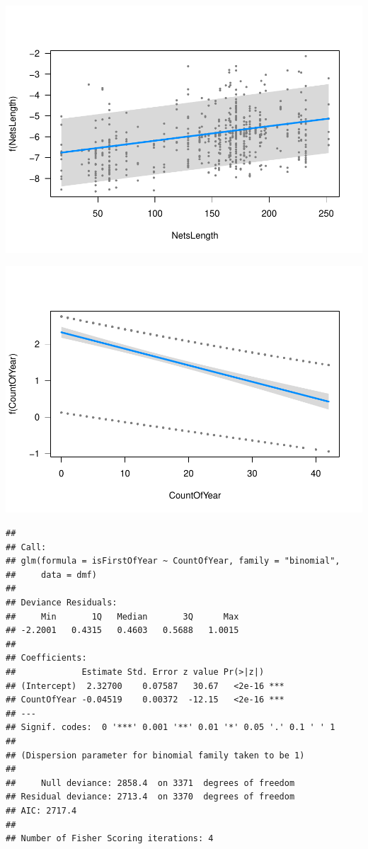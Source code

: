 \documentclass[]{interact}
\theoremstyle{plain}%
\theoremstyle{definition}
\theoremstyle{remark}
\begin{document}
\includegraphics{manuscript_files/figure-latex/unnamed-chunk-11-4.pdf}

\includegraphics{manuscript_files/figure-latex/unnamed-chunk-12-1.pdf}

\begin{verbatim}
## 
## Call:
## glm(formula = isFirstOfYear ~ CountOfYear, family = "binomial", 
##     data = dmf)
## 
## Deviance Residuals: 
##     Min       1Q   Median       3Q      Max  
## -2.2001   0.4315   0.4603   0.5688   1.0015  
## 
## Coefficients:
##             Estimate Std. Error z value Pr(>|z|)    
## (Intercept)  2.32700    0.07587   30.67   <2e-16 ***
## CountOfYear -0.04519    0.00372  -12.15   <2e-16 ***
## ---
## Signif. codes:  0 '***' 0.001 '**' 0.01 '*' 0.05 '.' 0.1 ' ' 1
## 
## (Dispersion parameter for binomial family taken to be 1)
## 
##     Null deviance: 2858.4  on 3371  degrees of freedom
## Residual deviance: 2713.4  on 3370  degrees of freedom
## AIC: 2717.4
## 
## Number of Fisher Scoring iterations: 4
\end{verbatim}
\end{document}
